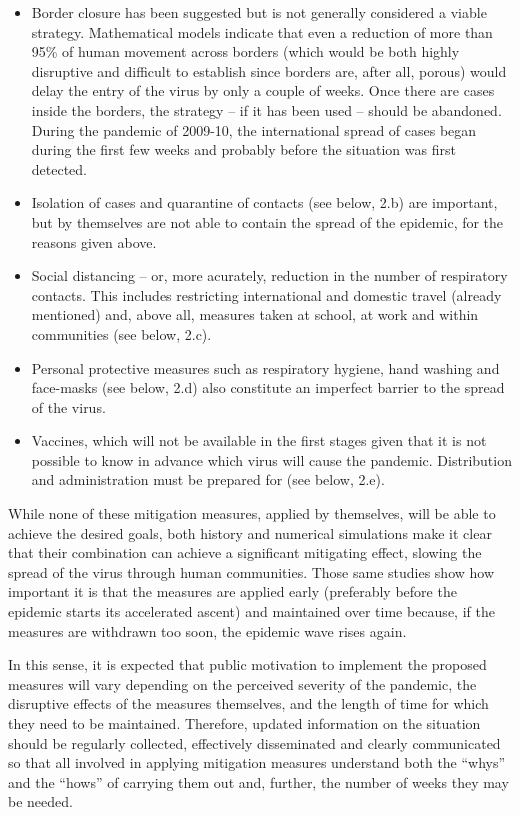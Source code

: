 \documentclass[12pt, a4]{scrartcl}
\begin{document}
\begin{itemize}
	\item Border closure has been suggested but is not generally considered a viable strategy. Mathematical models indicate that even a reduction of more than 95\% of human movement across borders (which would be both highly disruptive and difficult to establish since borders are, after all, porous) would delay the entry of the virus by only a couple of weeks. Once there are cases inside the borders, the strategy – if it has been used – should be abandoned. During the pandemic of 2009-10, the international spread of cases began during the first few weeks and probably before the situation was first detected.
	\item Isolation of cases and quarantine of contacts (see below, 2.b) are important, but by themselves are not able to contain the spread of the epidemic, for the reasons given above.
	\item Social distancing – or, more acurately, reduction in the number of respiratory contacts. This includes restricting international and domestic travel (already mentioned) and, above all, measures taken at school, at work and within communities (see below, 2.c).
	\item Personal protective measures such as respiratory hygiene, hand washing and face-masks (see below, 2.d) also constitute an imperfect barrier to the spread of the virus.
	\item Vaccines, which will not be available in the first stages given that it is not possible to know in advance which virus will cause the pandemic. Distribution and administration must be prepared for (see below, 2.e).
\end{itemize}

While none of these mitigation measures, applied by themselves, will be able to achieve the desired goals, both history and numerical simulations make it clear that their combination can achieve a significant mitigating effect, slowing the spread of the virus through human communities. Those same studies show how important it is that the measures are applied early (preferably before the epidemic starts its accelerated ascent) and maintained over time because, if the measures are withdrawn too soon, the epidemic wave rises again.

In this sense, it is expected that public motivation to implement the proposed measures will vary depending on the perceived severity of the pandemic, the disruptive effects of the measures themselves, and the length of time for which they need to be maintained. Therefore, updated information on the situation should be regularly collected, effectively disseminated and clearly communicated so that all involved in applying mitigation measures understand both the “whys” and the “hows” of carrying them out and, further, the number of weeks they may be needed.
\end{document}
